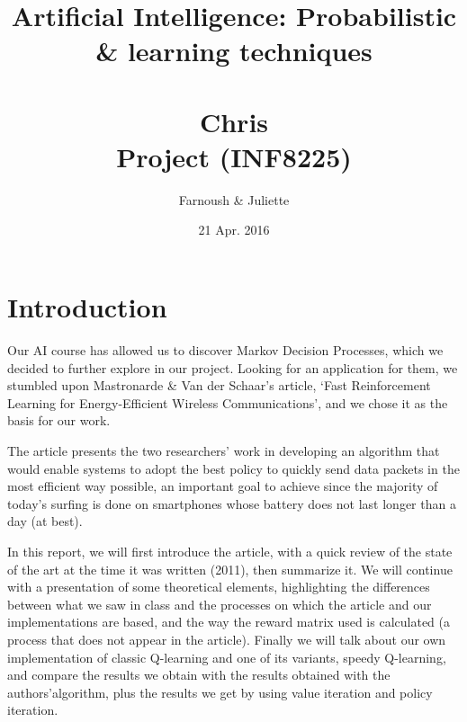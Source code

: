 \documentclass[a4paper, 12pt]{report}
\begin{document}
\def\labelitemi{$\bullet$}

\title{{\Large \textbf{Artificial Intelligence: Probabilistic \& learning techniques\\ } \\Chris {} \\ Project (INF8225)}}
\author{Farnoush  \& Juliette } 
\date{21 Apr. 2016}

\maketitle

\setcounter{tocdepth}{5}

\tableofcontents

\newpage

\chapter*{Introduction}

Our AI course has allowed us to discover Markov Decision Processes, which we decided to further explore
in our project.
Looking for an application for them, we stumbled upon Mastronarde \& Van der Schaar's article,
`Fast Reinforcement Learning for Energy-Efficient Wireless Communications'\cite{Mastronarde-2011},
and we chose it as the basis for our work.

The article presents the two researchers' work in developing an algorithm that would enable systems
to adopt the best policy to quickly send data packets in the most efficient way possible,
an important goal to achieve since the majority of today's surfing is done on smartphones
whose battery does not last longer than a day (at best).

In this report, we will first introduce the article, with a quick review of the state of the art
at the time it was written (2011), then summarize it.
We will continue with a presentation of some theoretical elements, highlighting the differences between
what we saw in class and the processes on which the article and our implementations are based,
and the way the reward matrix used is calculated (a process that does not appear in the article).
Finally we will talk about our own implementation of classic Q-learning and one of its variants,
speedy Q-learning, and compare the results we obtain with the results obtained with the authors'algorithm,
plus the results we get by using value iteration and policy iteration.
\end{document}

